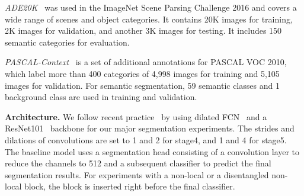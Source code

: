 \documentclass[runningheads]{llncs}
\begin{document}
\emph{ADE20K}~\cite{zhou2017scene} was used in the ImageNet Scene Parsing Challenge 2016 and covers a wide range of scenes and object categories. It contains 20K images for training, 2K images for validation, and another 3K images for testing. It includes 150 semantic categories for evaluation.

\emph{PASCAL-Context}~\cite{mottaghi2014the} is a set of additional annotations for PASCAL VOC 2010, which label more than 400 categories of 4,998 images for training and 5,105 images for validation. For semantic segmentation, 59 semantic classes and 1 background class are used in training and validation.

\noindent \textbf{Architecture.} We follow recent practice~\cite{huang2019ccnet} by using dilated FCN~\cite{long2015fcn} and a ResNet101~\cite{he2016deep} backbone for our major segmentation experiments. The strides and dilations of  convolutions are set to 1 and 2 for stage4, and 1 and 4 for stage5. The baseline model uses a segmentation head consisting of a  convolution layer to reduce the channels to 512 and a subsequent classifier to predict the final segmentation results. For experiments with a non-local or a disentangled non-local block, the block is inserted right before the final classifier.

\begin{table}[t]
\small
\centering
\caption{Ablation study on the validation set of Cityscapes}
\vspace{0pt}
\label{tab:ablation}
\vspace{-20pt}
\end{table}
\end{document}

